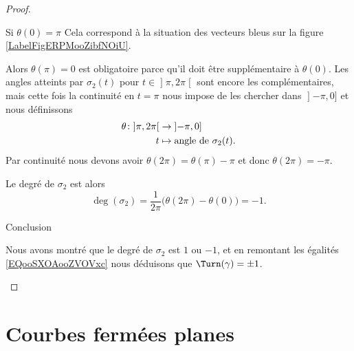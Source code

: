 \begin{proof}
\begin{subproof}
\begin{subproof}
                \item[Si \( \theta(0)=\pi\)]
                    Cela correspond à la situation des vecteurs bleus sur la figure \ref{LabelFigERPMooZibfNOiU}.

                Alors \( \theta(\pi)=0\) est obligatoire parce qu'il doit être supplémentaire à \( \theta(0)\). Les angles atteints par \( \sigma_2(t)\) pour \( t\in\mathopen] \pi , 2\pi \mathclose[ \) sont encore les complémentaires, mais cette fois la continuité en \( t=\pi\) nous impose de les chercher dans \( \mathopen] -\pi , 0 \mathclose]\) et nous définissons
                \begin{equation}
                    \begin{aligned}
                    \theta\colon \mathopen] \pi , 2\pi \mathclose[&\to \mathopen] -\pi , 0 \mathclose] \\
                    t&\mapsto \text{angle de \( \sigma_2(t)\)}. 
                    \end{aligned}
                \end{equation}
                Par continuité nous devons avoir \( \theta(2\pi)=\theta(\pi)-\pi\) et donc \( \theta(2\pi)=-\pi\).

                Le degré de \( \sigma_2\) est alors
                \begin{equation}
                    \deg(\sigma_2)=\frac{1}{ 2\pi }\big( \theta(2\pi)-\theta(0) \big)=-1.
                \end{equation}
                
            \end{subproof}

        \item[Conclusion]

            Nous avons montré que le degré de \( \sigma_2\) est \( 1\) ou \( -1\), et en remontant les égalités \eqref{EQooSXOAooZVOVxc} nous déduisons que \( \Turn(\gamma)=\pm 1\).

    \end{subproof}
\end{proof}

\section{Courbes fermées planes}

